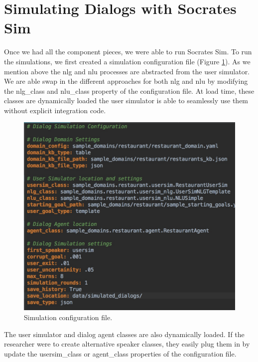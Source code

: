 \section{Simulating Dialogs with Socrates Sim}
Once we had all the component pieces, we were able to run Socrates Sim. To run the simulations, we first created a simulation configuration file (Figure \ref{fig:restaurant_sim_config }). As we mention above the nlg and nlu processes are abstracted from the user simulator. We are able swap in the different approaches for both nlg and nlu by modifying the nlg\_class and nlu\_class property of the configuration file. At load time, these classes are dynamically loaded the user simulator is able to seamlessly use them without explicit integration code. 

\begin{figure}[h!]
	\centering
	\includegraphics[scale=.35]{diagrams/restaurant_sim_config.jpeg}
	\caption{ Simulation configuration file. }
	\label{fig:restaurant_sim_config }
\end{figure}

The user simulator and dialog agent classes are also dynamically loaded. If the researcher were to create alternative speaker classes, they easily plug them in by update the usersim\_class or agent\_class properties of the configuration file.

